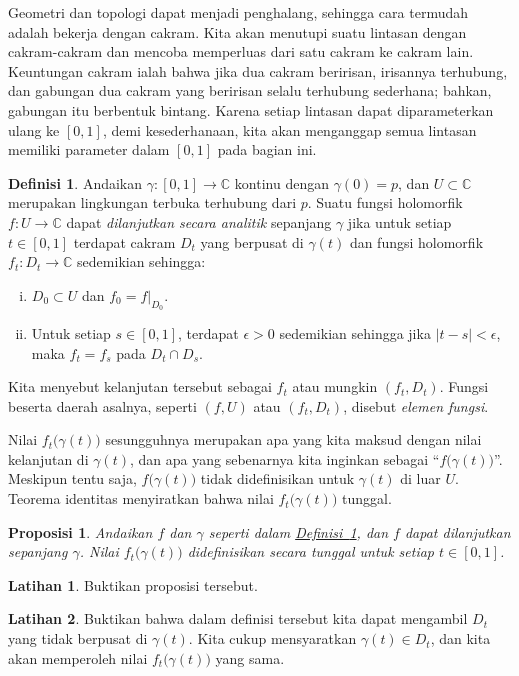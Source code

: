 \documentclass[12pt,openany]{book}
\newcommand{\sabs}[1]{\lvert {#1} \rvert}
\newcommand{\C}{{\mathbb{C}}}
\newcommand{\myindex}[1]{#1\index{#1}}
\newcommand{\myquote}[1]{``#1''}
\theoremstyle{plain}
\newtheorem{prop}[thm]{Proposisi}
\theoremstyle{remark}
\theoremstyle{definition}
\newtheorem{defn}[thm]{Definisi}
\newenvironment{exbox}{%
    \def\FrameCommand{\vrule width 1pt \relax\hspace{10pt}}%
    \MakeFramed{\advance\hsize-\width\FrameRestore}%
}{%
    \endMakeFramed
}
\theoremstyle{exercise}
\newtheorem{exercise}{Latihan}[section]
\theoremstyle{example}
\newcommand{\defnref}[1]{\hyperref[#1]{Definisi~\ref*{#1}}}
\begin{document}
Geometri dan topologi dapat menjadi penghalang, sehingga cara termudah adalah
bekerja dengan cakram.  Kita akan menutupi suatu lintasan dengan cakram-cakram dan mencoba
memperluas dari satu cakram ke cakram lain.  Keuntungan cakram ialah bahwa jika dua
cakram beririsan, irisannya terhubung, dan gabungan dua
cakram yang beririsan selalu terhubung sederhana; bahkan, gabungan itu berbentuk bintang.
Karena setiap lintasan dapat diparameterkan ulang ke $[0,1]$, demi kesederhanaan,
kita akan menganggap semua lintasan memiliki parameter dalam $[0,1]$ pada bagian ini.

\begin{defn} \label{defn:analcont}
Andaikan $\gamma \colon [0,1] \to \C$ kontinu dengan $\gamma(0) = p$,
dan $U \subset \C$ merupakan lingkungan terbuka terhubung dari $p$.
Suatu fungsi holomorfik 
$f \colon U \to \C$
dapat
\emph{dilanjutkan secara analitik}
sepanjang $\gamma$
jika untuk setiap $t \in [0,1]$ terdapat
cakram $D_t$ yang berpusat di $\gamma(t)$ dan fungsi holomorfik
$f_t \colon D_t \to \C$ sedemikian sehingga:
\begin{enumerate}[(i)]
\item
$D_0 \subset U$ dan $f_0 = f|_{D_0}$.
\item
Untuk setiap $s \in [0,1]$, terdapat
$\epsilon > 0$ sedemikian sehingga jika $\sabs{t-s} < \epsilon$, maka
$f_t = f_s$ pada $D_t \cap D_s$.
\end{enumerate}
Kita menyebut kelanjutan tersebut sebagai $f_t$ atau mungkin $(f_t,D_t)$.
Fungsi beserta daerah asalnya, seperti $(f,U)$ atau $(f_t,D_t)$,
disebut \emph{\myindex{elemen fungsi}}.
\end{defn}

Nilai
$f_t\bigl(\gamma(t)\bigr)$ sesungguhnya merupakan apa yang kita maksud dengan nilai
kelanjutan di $\gamma(t)$, dan apa yang sebenarnya kita inginkan sebagai
\myquote{$f\bigl(\gamma(t)\bigr)$}.
Meskipun tentu saja, $f\bigl(\gamma(t)\bigr)$ tidak didefinisikan untuk $\gamma(t)$ di luar
$U$.
Teorema identitas menyiratkan bahwa nilai
$f_t\bigl(\gamma(t)\bigr)$ tunggal.

\begin{prop}
Andaikan $f$ dan $\gamma$ seperti dalam \defnref{defn:analcont},
dan
$f$ dapat dilanjutkan sepanjang $\gamma$.
Nilai $f_t\bigl(\gamma(t)\bigr)$ didefinisikan secara tunggal
untuk setiap $t \in [0,1]$.
\end{prop}

\begin{exbox}
\begin{exercise}
Buktikan proposisi tersebut.
\end{exercise}

\begin{exercise}
Buktikan bahwa dalam definisi tersebut kita dapat mengambil $D_t$ yang tidak berpusat di
$\gamma(t)$.  Kita cukup mensyaratkan $\gamma(t) \in D_t$, dan kita akan
memperoleh nilai $f_t\bigl(\gamma(t)\bigr)$ yang sama.
\end{exercise}
\end{exbox}
\end{document}
